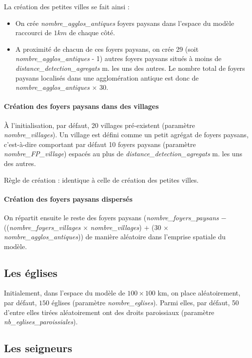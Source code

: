 \documentclass[a4paper,11pt]{article}
\begin{document}
La création des petites villes se fait ainsi :
\begin{itemize}
  \item On crée \textit{nombre\_agglos\_antiques} foyers paysans dans l'espace du modèle raccourci de $1km$ de chaque côté.
  \item A proximité de chacun de ces foyers paysans, on crée 29 (soit \textit{nombre\_agglos\_antiques} - 1) autres foyers paysans situés à moins de \textit{distance\_detection\_agregats} m. les uns des autres. Le nombre total de foyers paysans localisés dans une agglomération antique est donc de \textit{nombre\_agglos\_antiques} $\times$ 30.
\end{itemize}

\paragraph{Création des foyers paysans dans des villages}
À l'initialisation, par défaut, 20 villages pré-existent (paramètre \textit{nombre\_villages}). Un village est défini comme un petit agrégat de foyers paysans, c'est-à-dire comportant par défaut 10 foyers paysans (paramètre  \textit{nombre\_FP\_village}) espacés au plus de \textit{distance\_detection\_agregats} m. les uns des autres.

Règle de création : identique à celle de création des petites villes.

\paragraph{Création des foyers paysans dispersés}
On répartit ensuite le reste des foyers paysans (\textit{nombre\_foyers\_paysans} $-$ ((\textit{nombre\_foyers\_villages} $\times$ \textit{nombre\_villages}) $+$ (30 $\times$ \textit{nombre\_agglos\_antiques})) de manière aléatoire dans l'emprise spatiale du modèle.

\subsection{Les églises}
Initialement, dans l'espace du modèle de $100 \times 100$ km, on place aléatoirement, par défaut, $150$ églises (paramètre \textit{nombre\_eglises}). Parmi elles, par défaut, 50 d'entre elles tirées aléatoirement ont des droits paroissiaux (paramètre \textit{nb\_eglises\_paroissiales}).

\subsection{Les seigneurs}
\end{document}
